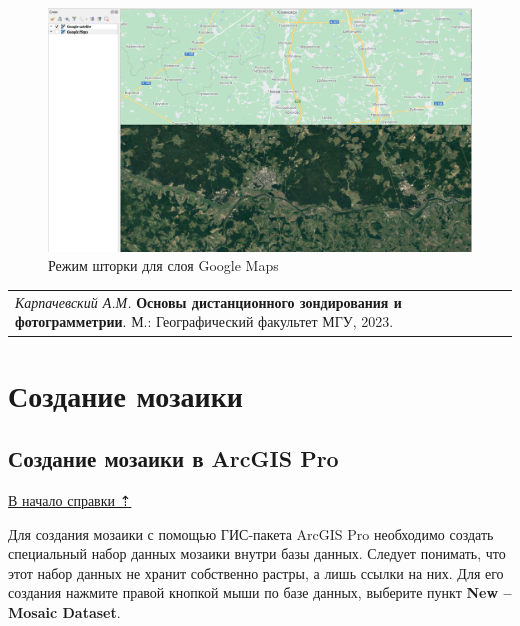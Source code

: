 \documentclass[
  12pt,
]{book}
\begin{document}
\begin{figure}
\centering
\includegraphics{images/Ref02/Swipe.png}
\caption{Режим шторки для слоя Google Maps}
\end{figure}

\begin{longtable}[]{@{}l@{}}
\toprule\noalign{}
\endhead
\bottomrule\noalign{}
\endlastfoot
\emph{Карпачевский А.М.} \textbf{Основы дистанционного зондирования и фотограмметрии}. М.: Географический факультет МГУ, 2023. \\
\end{longtable}

\hypertarget{mosaic}{%
\chapter{Создание мозаики}\label{mosaic}}

\hypertarget{mosaic-arcgis}{%
\section{Создание мозаики в ArcGIS Pro}\label{mosaic-arcgis}}

\protect\hyperlink{mosaic}{В начало справки ⇡}

Для создания мозаики с помощью ГИС-пакета ArcGIS Pro необходимо создать специальный набор данных мозаики внутри базы данных. Следует понимать, что этот набор данных не хранит собственно растры, а лишь ссылки на них. Для его создания нажмите правой кнопкой мыши по базе данных, выберите пункт \textbf{New -- Mosaic Dataset}.
\end{document}
